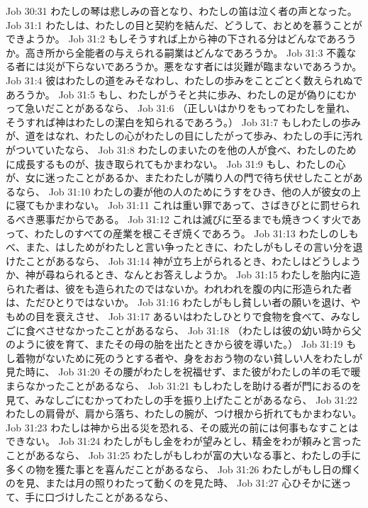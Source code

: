 Job 30:31  わたしの琴は悲しみの音となり、わたしの笛は泣く者の声となった。
Job 31:1  わたしは、わたしの目と契約を結んだ、どうして、おとめを慕うことができようか。
Job 31:2  もしそうすれば上から神の下される分はどんなであろうか。高き所から全能者の与えられる嗣業はどんなであろうか。
Job 31:3  不義なる者には災が下らないであろうか。悪をなす者には災難が臨まないであろうか。
Job 31:4  彼はわたしの道をみそなわし、わたしの歩みをことごとく数えられぬであろうか。
Job 31:5  もし、わたしがうそと共に歩み、わたしの足が偽りにむかって急いだことがあるなら、
Job 31:6  （正しいはかりをもってわたしを量れ、そうすれば神はわたしの潔白を知られるであろう。）
Job 31:7  もしわたしの歩みが、道をはなれ、わたしの心がわたしの目にしたがって歩み、わたしの手に汚れがついていたなら、
Job 31:8  わたしのまいたのを他の人が食べ、わたしのために成長するものが、抜き取られてもかまわない。
Job 31:9  もし、わたしの心が、女に迷ったことがあるか、またわたしが隣り人の門で待ち伏せしたことがあるなら、
Job 31:10  わたしの妻が他の人のためにうすをひき、他の人が彼女の上に寝てもかまわない。
Job 31:11  これは重い罪であって、さばきびとに罰せられるべき悪事だからである。
Job 31:12  これは滅びに至るまでも焼きつくす火であって、わたしのすべての産業を根こそぎ焼くであろう。
Job 31:13  わたしのしもべ、また、はしためがわたしと言い争ったときに、わたしがもしその言い分を退けたことがあるなら、
Job 31:14  神が立ち上がられるとき、わたしはどうしようか、神が尋ねられるとき、なんとお答えしようか。
Job 31:15  わたしを胎内に造られた者は、彼をも造られたのではないか。われわれを腹の内に形造られた者は、ただひとりではないか。
Job 31:16  わたしがもし貧しい者の願いを退け、やもめの目を衰えさせ、
Job 31:17  あるいはわたしひとりで食物を食べて、みなしごに食べさせなかったことがあるなら、
Job 31:18  （わたしは彼の幼い時から父のように彼を育て、またその母の胎を出たときから彼を導いた。）
Job 31:19  もし着物がないために死のうとする者や、身をおおう物のない貧しい人をわたしが見た時に、
Job 31:20  その腰がわたしを祝福せず、また彼がわたしの羊の毛で暖まらなかったことがあるなら、
Job 31:21  もしわたしを助ける者が門におるのを見て、みなしごにむかってわたしの手を振り上げたことがあるなら、
Job 31:22  わたしの肩骨が、肩から落ち、わたしの腕が、つけ根から折れてもかまわない。
Job 31:23  わたしは神から出る災を恐れる、その威光の前には何事もなすことはできない。
Job 31:24  わたしがもし金をわが望みとし、精金をわが頼みと言ったことがあるなら、
Job 31:25  わたしがもしわが富の大いなる事と、わたしの手に多くの物を獲た事とを喜んだことがあるなら、
Job 31:26  わたしがもし日の輝くのを見、または月の照りわたって動くのを見た時、
Job 31:27  心ひそかに迷って、手に口づけしたことがあるなら、
